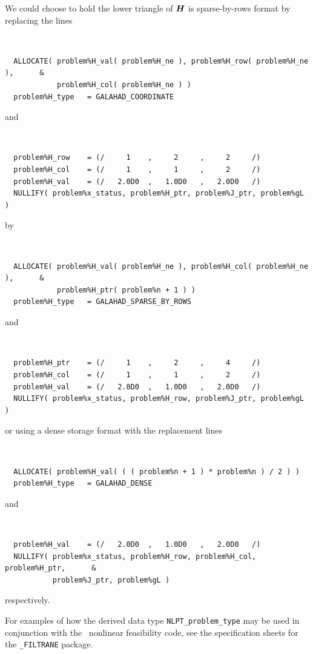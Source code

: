 \documentclass{galahad}
\newcommand{\packagename}{NLPT}
\begin{document}
\noindent
We could choose to hold the lower triangle of ${\bm{H}}$ is sparse-by-rows format
by replacing the lines
{\tt \small
\begin{verbatim}
  ALLOCATE( problem%H_val( problem%H_ne ), problem%H_row( problem%H_ne ),      &
            problem%H_col( problem%H_ne ) )
  problem%H_type   = GALAHAD_COORDINATE
\end{verbatim}
}
\noindent
and
{\tt \small
\begin{verbatim}
  problem%H_row    = (/     1    ,     2     ,     2     /)
  problem%H_col    = (/     1    ,     1     ,     2     /)
  problem%H_val    = (/   2.0D0  ,   1.0D0   ,   2.0D0   /)
  NULLIFY( problem%x_status, problem%H_ptr, problem%J_ptr, problem%gL )
\end{verbatim}
}
\noindent
by
{\tt \small
\begin{verbatim}
  ALLOCATE( problem%H_val( problem%H_ne ), problem%H_col( problem%H_ne ),      &
            problem%H_ptr( problem%n + 1 ) )
  problem%H_type   = GALAHAD_SPARSE_BY_ROWS
\end{verbatim}
}
\noindent
and
{\tt \small
\begin{verbatim}
  problem%H_ptr    = (/     1    ,     2     ,     4     /)
  problem%H_col    = (/     1    ,     1     ,     2     /)
  problem%H_val    = (/   2.0D0  ,   1.0D0   ,   2.0D0   /)
  NULLIFY( problem%x_status, problem%H_row, problem%J_ptr, problem%gL )
\end{verbatim}
}
\noindent
or using a dense storage format with the replacement lines
{\tt \small
\begin{verbatim}
  ALLOCATE( problem%H_val( ( ( problem%n + 1 ) * problem%n ) / 2 ) )
  problem%H_type   = GALAHAD_DENSE
\end{verbatim}
}
\noindent
and 
{\tt \small
\begin{verbatim}
  problem%H_val    = (/   2.0D0  ,   1.0D0   ,   2.0D0   /)
  NULLIFY( problem%x_status, problem%H_row, problem%H_col, problem%H_ptr,      &
           problem%J_ptr, problem%gL )
\end{verbatim}
}
\noindent
respectively.

For examples of how the derived data type
{\tt \packagename\_problem\_type} may be used in conjunction with the
\galahad\ nonlinear feasibility code, see the specification sheets 
for the {\tt \libraryname\_FILTRANE} package.
\end{document}
